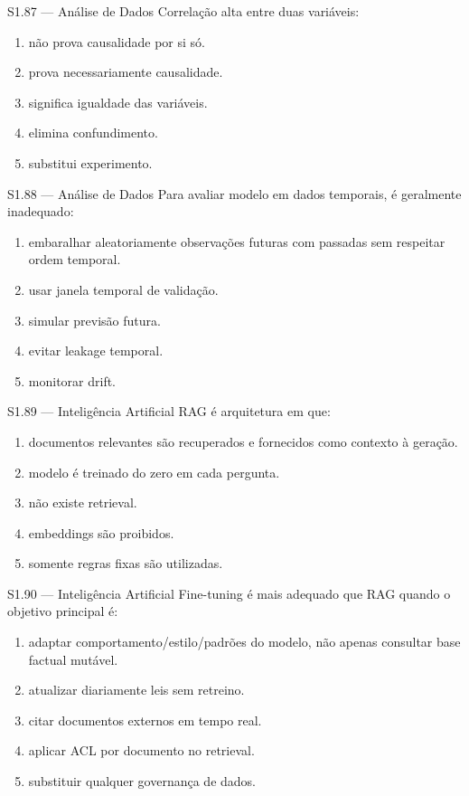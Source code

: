 \begin{questao}{S1.87 — Análise de Dados}
Correlação alta entre duas variáveis:
\begin{enumerate}[label=\Alph*)]\item não prova causalidade por si só.\item prova necessariamente causalidade.\item significa igualdade das variáveis.\item elimina confundimento.\item substitui experimento.\end{enumerate}
\end{questao}

\begin{questao}{S1.88 — Análise de Dados}
Para avaliar modelo em dados temporais, é geralmente inadequado:
\begin{enumerate}[label=\Alph*)]\item embaralhar aleatoriamente observações futuras com passadas sem respeitar ordem temporal.\item usar janela temporal de validação.\item simular previsão futura.\item evitar leakage temporal.\item monitorar drift.\end{enumerate}
\end{questao}

\begin{questao}{S1.89 — Inteligência Artificial}
RAG é arquitetura em que:
\begin{enumerate}[label=\Alph*)]\item documentos relevantes são recuperados e fornecidos como contexto à geração.\item modelo é treinado do zero em cada pergunta.\item não existe retrieval.\item embeddings são proibidos.\item somente regras fixas são utilizadas.\end{enumerate}
\end{questao}

\begin{questao}{S1.90 — Inteligência Artificial}
Fine-tuning é mais adequado que RAG quando o objetivo principal é:
\begin{enumerate}[label=\Alph*)]\item adaptar comportamento/estilo/padrões do modelo, não apenas consultar base factual mutável.\item atualizar diariamente leis sem retreino.\item citar documentos externos em tempo real.\item aplicar ACL por documento no retrieval.\item substituir qualquer governança de dados.\end{enumerate}
\end{questao}

